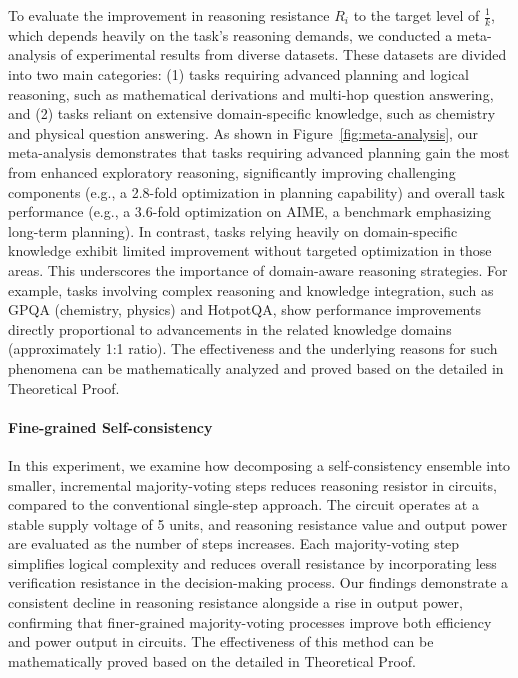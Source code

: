 To evaluate the improvement in reasoning resistance \( R_i \) to the target level of \( \frac{1}{k} \), which depends heavily on the task's reasoning demands, we conducted a meta-analysis of experimental results from diverse datasets. These datasets are divided into two main categories: (1) tasks requiring advanced planning and logical reasoning, such as mathematical derivations and multi-hop question answering, and (2) tasks reliant on extensive domain-specific knowledge, such as chemistry and physical question answering.
As shown in Figure~\ref{fig:meta-analysis}, our meta-analysis demonstrates that tasks requiring advanced planning gain the most from enhanced exploratory reasoning, significantly improving challenging components (e.g., a 2.8-fold optimization in planning capability) and overall task performance (e.g., a 3.6-fold optimization on AIME, a benchmark emphasizing long-term planning). In contrast, tasks relying heavily on domain-specific knowledge exhibit limited improvement without targeted optimization in those areas. This underscores the importance of domain-aware reasoning strategies. For example, tasks involving complex reasoning and knowledge integration, such as GPQA (chemistry, physics) and HotpotQA, show performance improvements directly proportional to advancements in the related knowledge domains (approximately 1:1 ratio). The effectiveness and the underlying reasons for such phenomena can be mathematically analyzed and proved based on the \modelname{} detailed in Theoretical Proof.


\paragraph{Fine-grained Self-consistency}

In this experiment, we examine how decomposing a self-consistency ensemble into smaller, incremental majority-voting steps reduces reasoning resistor in circuits, compared to the conventional single-step approach. The circuit operates at a stable supply voltage of 5 units, and reasoning resistance value and output power are evaluated as the number of steps increases. Each majority-voting step simplifies logical complexity and reduces overall resistance by incorporating less verification resistance in the decision-making process. Our findings demonstrate a consistent decline in reasoning resistance alongside a rise in output power, confirming that finer-grained majority-voting processes improve both efficiency and power output in circuits. The effectiveness of this method can be mathematically proved based on the \modelname{} detailed in Theoretical Proof.

